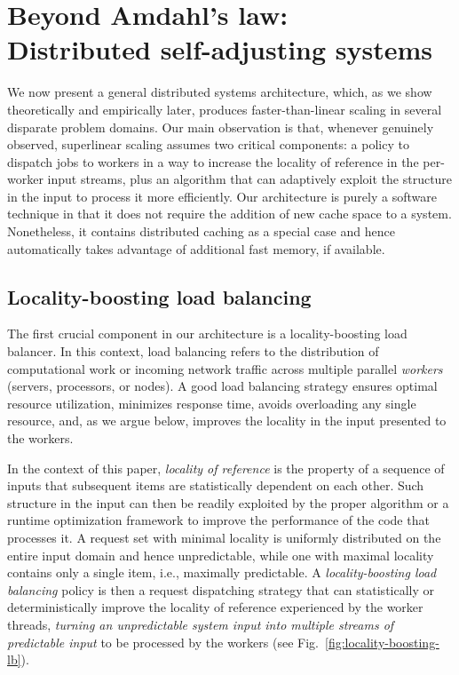 \section{Beyond Amdahl's law:\\Distributed self-adjusting systems}
\label{sec:architecture}

We now present a general distributed systems architecture, which, as we show theoretically and empirically later, produces faster-than-linear scaling in several disparate problem domains. Our main observation is that, whenever genuinely observed, superlinear scaling assumes two critical components: a policy to dispatch jobs to workers in a way to increase the locality of reference in the per-worker input streams, plus an algorithm that can adaptively exploit the structure in the input to process it more efficiently. Our architecture is purely a software technique in that it does not require the addition of new cache space to a system. Nonetheless, it contains distributed caching as a special case and hence automatically takes advantage of additional fast memory, if available.

\subsection{Locality-boosting load balancing}
\label{sec:lb-lb}

The first crucial component in our architecture is a locality-boosting load balancer.  In this context, load balancing refers to the distribution of computational work or incoming network traffic across multiple parallel \emph{workers} (servers, processors, or nodes). A good load balancing strategy ensures optimal resource utilization, minimizes response time, avoids overloading any single resource, and, as we argue below, improves the locality in the input presented to the workers. 

In the context of this paper, \emph{locality of reference} is the property of a sequence of inputs that subsequent items are statistically dependent on each other. Such structure in the input can then be readily exploited by the proper algorithm \cite{SleatorT85Splay, BentleyCL93, HesterH85, HesterH85, BentleySTW86, Avin0020, ParkM12} or a runtime optimization framework \cite{276946,246322,10.1145/3503222.3507769,procieee_2019} to improve the performance of the code that processes it. A request set with minimal locality is uniformly distributed on the entire input domain and hence unpredictable, while one with maximal locality contains only a single item, i.e., maximally predictable. A \emph{locality-boosting load balancing} policy is then a request dispatching strategy that can statistically or deterministically improve the locality of reference experienced by the worker threads, \emph{turning an unpredictable system input into multiple streams of predictable input} to be processed by the workers (see Fig.~\ref{fig:locality-boosting-lb}).

